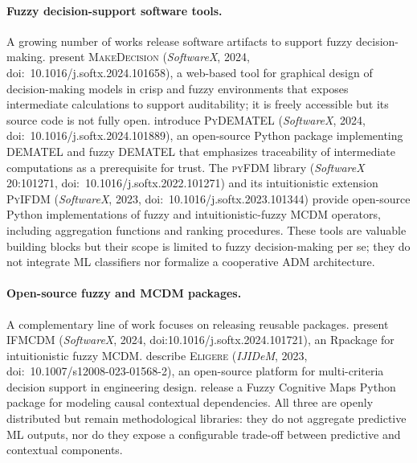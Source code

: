 \paragraph{Fuzzy decision-support software tools.}
A growing number of works release software artifacts to support fuzzy decision-making.
\citet{wieckowski2024makedecision} present \textsc{MakeDecision} (\textit{SoftwareX}, 2024,
doi:~10.1016/j.softx.2024.101658), a web-based tool for graphical design of decision-making
models in crisp and fuzzy environments that exposes intermediate calculations to support
auditability; it is freely accessible but its source code is not fully open.
\citet{chekry2024dematel} introduce \textsc{PyDEMATEL} (\textit{SoftwareX}, 2024,
doi:~10.1016/j.softx.2024.101889), an open-source Python package implementing DEMATEL and
fuzzy DEMATEL that emphasizes traceability of intermediate computations as a prerequisite for
trust. The \textsc{pyFDM} library \citep{wieckowski2022pyfdm} (\textit{SoftwareX}
20:101271, doi:~10.1016/j.softx.2022.101271) and its intuitionistic extension
\textsc{PyIFDM} \citep{wieckowski2023pyifdm} (\textit{SoftwareX}, 2023,
doi:~10.1016/j.softx.2023.101344) provide open-source Python implementations of fuzzy and
intuitionistic-fuzzy MCDM operators, including aggregation functions and ranking procedures.
These tools are valuable building blocks but their scope is limited to fuzzy decision-making
per se; they do not integrate ML classifiers nor formalize a cooperative ADM architecture.

\paragraph{Open-source fuzzy and MCDM packages.}
A complementary line of work focuses on releasing reusable packages.
\citet{roszkowska2024intuitionisticfuzzy} present \textsc{IFMCDM} (\textit{SoftwareX}, 2024,
doi:10.1016/j.softx.2024.101721), an Rpackage for intuitionistic fuzzy MCDM.
\citet{grazioso2023eligere} describe \textsc{Eligere} (\textit{IJIDeM}, 2023,
doi:~10.1007/s12008-023-01568-2), an open-source platform for multi-criteria decision
support in engineering design. \citet{dikopoulou2021fcm} release a Fuzzy Cognitive Maps
Python package for modeling causal contextual dependencies. All three are openly distributed
but remain methodological libraries: they do not aggregate predictive ML outputs, nor do
they expose a configurable trade-off between predictive and contextual components.

